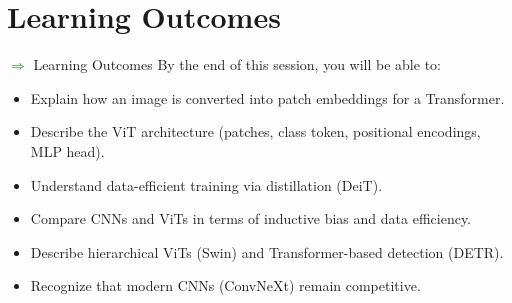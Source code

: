 \section{Learning Outcomes}
\begin{frame}[allowframebreaks]{\textcolor{green}{$\Rightarrow$} Learning Outcomes}
    By the end of this session, you will be able to:
    \begin{itemize}
        \item Explain how an image is converted into patch embeddings for a Transformer.
        \item Describe the ViT architecture (patches, class token, positional encodings, MLP head).
        \item Understand data-efficient training via distillation (DeiT).
        \item Compare CNNs and ViTs in terms of inductive bias and data efficiency.
        \item Describe hierarchical ViTs (Swin) and Transformer-based detection (DETR).
        \item Recognize that modern CNNs (ConvNeXt) remain competitive.
    \end{itemize}
\end{frame}
